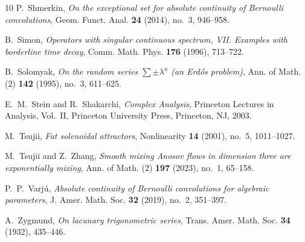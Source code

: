 \documentclass[11pt]{amsart}
\theoremstyle{plain}
\theoremstyle{definition}
\numberwithin{equation}{section}
\begin{document}
\begin{thebibliography}{10}
P.~Shmerkin,
\emph{On the exceptional set for absolute continuity of Bernoulli convolutions},
Geom. Funct. Anal. \textbf{24} (2014), no.~3, 946--958.

B.~Simon,
\emph{Operators with singular continuous spectrum, VII. Examples with borderline time decay},
Comm. Math. Phys. \textbf{176} (1996), 713--722.

B.~Solomyak,
\emph{On the random series $\sum \pm \lambda^n$ (an Erd\H{o}s problem)},
Ann. of Math. (2) \textbf{142} (1995), no.~3, 611--625.

E.~M.~Stein and R.~Shakarchi,
\emph{Complex Analysis},
Princeton Lectures in Analysis, Vol.~II,
Princeton University Press, Princeton, NJ, 2003.

M.~Tsujii,
\emph{Fat solenoidal attractors},
Nonlinearity \textbf{14} (2001), no.~5, 1011--1027.

M.~Tsujii and Z.~Zhang,
\emph{Smooth mixing Anosov flows in dimension three are exponentially mixing},
Ann. of Math. (2) \textbf{197} (2023), no.~1, 65--158.

P.~P.~Varj\'u,
\emph{Absolute continuity of Bernoulli convolutions for algebraic parameters},
J. Amer. Math. Soc. \textbf{32} (2019), no.~2, 351--397.

A.~Zygmund,
\emph{On lacunary trigonometric series},
Trans. Amer. Math. Soc. \textbf{34} (1932), 435--446.

\end{thebibliography}
\end{document}
